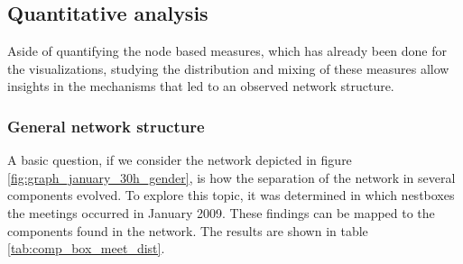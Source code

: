 \subsection{Quantitative analysis}
\label{subsec:quantitative_analysis}

Aside of quantifying the node based measures, which has already been done for the visualizations, studying the distribution and mixing of these measures allow insights in the mechanisms that led to an observed network structure.  

\subsubsection{General network structure}
\label{subsubsec:general_structure}

A basic question, if we consider the network depicted in figure \ref{fig:graph_january_30h_gender}, is how the separation of the network in several components evolved. To explore this topic, it was determined in which nestboxes the meetings occurred in January 2009. These findings can be mapped to the components found in the network. The results are shown in table \ref{tab:comp_box_meet_dist}.

